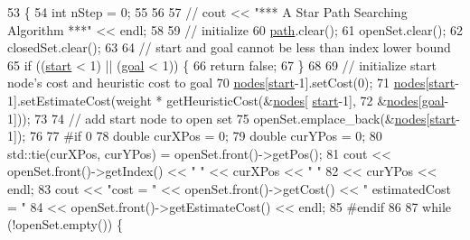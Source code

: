 \begin{DoxyCode}
53                                              \{
54     \textcolor{keywordtype}{int} nStep = 0;
55 
56 
57     \textcolor{comment}{// cout << "*** A Star Path Searching Algorithm ***" << endl;}
58 
59     \textcolor{comment}{// initialize}
60     \hyperlink{classPathFindingAlgorithm_ab177b2276cdf28fb77361bff19745b17}{path}.clear();
61     openSet.clear();
62     closedSet.clear();
63 
64     \textcolor{comment}{// start and goal cannot be less than index lower bound}
65     \textcolor{keywordflow}{if} ((\hyperlink{classPathFindingAlgorithm_a1c31bd6b8c57459c32ada19cf9bf412a}{start} < 1) || (\hyperlink{classPathFindingAlgorithm_ae8acf41f92ba72a969a44640c99fb8a4}{goal} < 1)) \{
66         \textcolor{keywordflow}{return} \textcolor{keyword}{false};
67     \}
68 
69     \textcolor{comment}{// initialize start node's cost and heuristic cost to goal}
70     \hyperlink{classPathFindingAlgorithm_a3405321350d5fb10ba367c47944a7b77}{nodes}[\hyperlink{classPathFindingAlgorithm_a1c31bd6b8c57459c32ada19cf9bf412a}{start}-1].setCost(0);
71     \hyperlink{classPathFindingAlgorithm_a3405321350d5fb10ba367c47944a7b77}{nodes}[\hyperlink{classPathFindingAlgorithm_a1c31bd6b8c57459c32ada19cf9bf412a}{start}-1].setEstimateCost(weight * getHeuristicCost(&\hyperlink{classPathFindingAlgorithm_a3405321350d5fb10ba367c47944a7b77}{nodes}[
      \hyperlink{classPathFindingAlgorithm_a1c31bd6b8c57459c32ada19cf9bf412a}{start}-1],
72                                    &\hyperlink{classPathFindingAlgorithm_a3405321350d5fb10ba367c47944a7b77}{nodes}[\hyperlink{classPathFindingAlgorithm_ae8acf41f92ba72a969a44640c99fb8a4}{goal}-1]));
73 
74     \textcolor{comment}{// add start node to open set}
75     openSet.emplace\_back(&\hyperlink{classPathFindingAlgorithm_a3405321350d5fb10ba367c47944a7b77}{nodes}[\hyperlink{classPathFindingAlgorithm_a1c31bd6b8c57459c32ada19cf9bf412a}{start}-1]);
76 
77 \textcolor{preprocessor}{#if 0}
78 \textcolor{preprocessor}{}    \textcolor{keywordtype}{double} curXPos = 0;
79     \textcolor{keywordtype}{double} curYPos = 0;
80     std::tie(curXPos, curYPos) = openSet.front()->getPos();
81     cout << openSet.front()->getIndex() << \textcolor{stringliteral}{" "} << curXPos << \textcolor{stringliteral}{" "}
82          << curYPos << endl;
83     cout << \textcolor{stringliteral}{"cost = "} << openSet.front()->getCost() << \textcolor{stringliteral}{" estimatedCost = "}
84          << openSet.front()->getEstimateCost() << endl;
85 \textcolor{preprocessor}{#endif}
86 \textcolor{preprocessor}{}
87     \textcolor{keywordflow}{while} (!openSet.empty()) \{

\end{DoxyCode}
